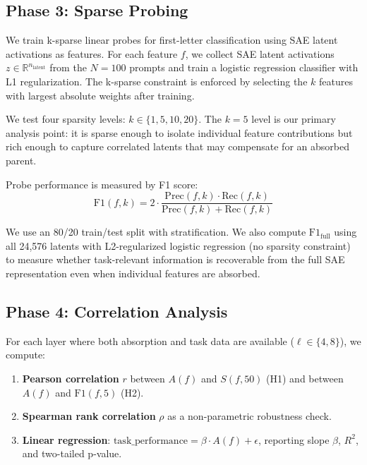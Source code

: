 \documentclass{article}
\begin{document}
\subsection{Phase 3: Sparse Probing}

We train k-sparse linear probes for first-letter classification using SAE latent activations as features. For each feature $f$, we collect SAE latent activations $z \in \mathbb{R}^{n_{\text{latent}}}$ from the $N = 100$ prompts and train a logistic regression classifier with L1 regularization. The k-sparse constraint is enforced by selecting the $k$ features with largest absolute weights after training.

We test four sparsity levels: $k \in \{1, 5, 10, 20\}$. The $k = 5$ level is our primary analysis point: it is sparse enough to isolate individual feature contributions but rich enough to capture correlated latents that may compensate for an absorbed parent.

Probe performance is measured by F1 score:
\begin{equation}
\text{F1}(f, k) = 2 \cdot \frac{\text{Prec}(f, k) \cdot \text{Rec}(f, k)}{\text{Prec}(f, k) + \text{Rec}(f, k)}
\end{equation}

We use an 80/20 train/test split with stratification. We also compute $\text{F1}_{\text{full}}$ using all 24,576 latents with L2-regularized logistic regression (no sparsity constraint) to measure whether task-relevant information is recoverable from the full SAE representation even when individual features are absorbed.

\subsection{Phase 4: Correlation Analysis}

For each layer where both absorption and task data are available ($\ell \in \{4, 8\}$), we compute:

\begin{enumerate}
    \item \textbf{Pearson correlation} $r$ between $A(f)$ and $S(f, 50)$ (H1) and between $A(f)$ and $\text{F1}(f, 5)$ (H2).
    \item \textbf{Spearman rank correlation} $\rho$ as a non-parametric robustness check.
    \item \textbf{Linear regression}: $\text{task\_performance} = \beta \cdot A(f) + \epsilon$, reporting slope $\beta$, $R^2$, and two-tailed p-value.
\end{enumerate}
\end{document}
